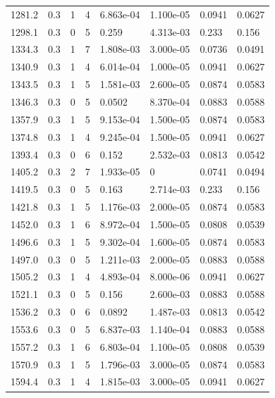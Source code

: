 \documentclass[preview]{standalone}
\begin{document}
{{{\begin{tabular}{L{1.2cm}C{1.2cm} C{0.3cm}C{0.5cm} C{1.4cm}C{1.4cm} C{1.4cm}C{1.4cm}}
  1281.2  &   0.3  & 1     &  4 &  6.863e-04  & 1.100e-05  & 0.0941 &  0.0627   \\ 
  1298.1  &   0.3  & 0     &  5 &  0.259  & 4.313e-03  & 0.233 &  0.156   \\ 
  1334.3  &   0.3  & 1     &  7 &  1.808e-03  & 3.000e-05  & 0.0736 &  0.0491   \\ 
  1340.9  &   0.3  & 1     &  4 &  6.014e-04  & 1.000e-05  & 0.0941 &  0.0627   \\ 
  1343.5  &   0.3  & 1     &  5 &  1.581e-03  & 2.600e-05  & 0.0874 &  0.0583   \\ 
  1346.3  &   0.3  & 0     &  5 &  0.0502  & 8.370e-04  & 0.0883 &  0.0588   \\ 
  1357.9  &   0.3  & 1     &  5 &  9.153e-04  & 1.500e-05  & 0.0874 &  0.0583   \\ 
  1374.8  &   0.3  & 1     &  4 &  9.245e-04  & 1.500e-05  & 0.0941 &  0.0627   \\ 
  1393.4  &   0.3  & 0     &  6 &  0.152  & 2.532e-03  & 0.0813 &  0.0542   \\ 
  1405.2  &   0.3  & 2     &  7 &  1.933e-05  & 0  & 0.0741 &  0.0494   \\ 
  1419.5  &   0.3  & 0     &  5 &  0.163  & 2.714e-03  & 0.233 &  0.156   \\ 
  1421.8  &   0.3  & 1     &  5 &  1.176e-03  & 2.000e-05  & 0.0874 &  0.0583   \\ 
  1452.0  &   0.3  & 1     &  6 &  8.972e-04  & 1.500e-05  & 0.0808 &  0.0539   \\ 
  1496.6  &   0.3  & 1     &  5 &  9.302e-04  & 1.600e-05  & 0.0874 &  0.0583   \\ 
  1497.0  &   0.3  & 0     &  5 &  1.211e-03  & 2.000e-05  & 0.0883 &  0.0588   \\ 
  1505.2  &   0.3  & 1     &  4 &  4.893e-04  & 8.000e-06  & 0.0941 &  0.0627   \\ 
  1521.1  &   0.3  & 0     &  5 &  0.156  & 2.600e-03  & 0.0883 &  0.0588   \\ 
  1536.2  &   0.3  & 0     &  6 &  0.0892  & 1.487e-03  & 0.0813 &  0.0542   \\ 
  1553.6  &   0.3  & 0     &  5 &  6.837e-03  & 1.140e-04  & 0.0883 &  0.0588   \\ 
  1557.2  &   0.3  & 1     &  6 &  6.803e-04  & 1.100e-05  & 0.0808 &  0.0539   \\ 
  1570.9  &   0.3  & 1     &  5 &  1.796e-03  & 3.000e-05  & 0.0874 &  0.0583   \\ 
  1594.4  &   0.3  & 1     &  4 &  1.815e-03  & 3.000e-05  & 0.0941 &  0.0627   \\ 

\end{tabular}}}}
\end{document}
